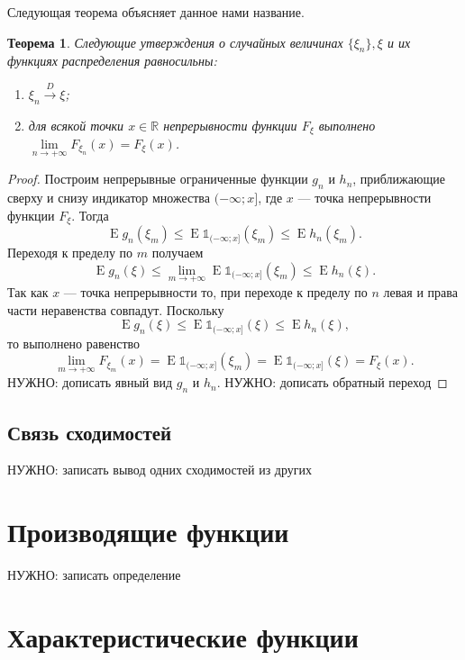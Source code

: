 \documentclass[12pt]{article}
\newtheorem{theorem}{Теорема}
\numberwithin{theorem}{section}
\theoremstyle{definition}
\newcommand{\RR}{\mathbb{R}}
\newcommand{\expect}{\operatorname{E}}
\newcommand{\ind}{\mathds{1}}
\newcommand{\TODO}[1]{\textcolor{todocolor}{НУЖНО: #1}}
\begin{document}
	Следующая теорема объясняет данное нами название.
	
	\begin{theorem}
		Следующие утверждения о случайных величинах $ \{\xi_n\}, \xi $
		и их функциях распределения равносильны:
		\begin{enumerate}
			\item $ \xi_n \overset{D}{\to} \xi $;
			\item для всякой точки $ x \in \RR $ непрерывности функции $ F_{\xi} $ 
			выполнено $ \lim\limits_{n \to +\infty} F_{\xi_n}(x) = F_{\xi}(x) $. 
		\end{enumerate}
	\end{theorem}
	
	\begin{proof}
		Построим непрерывные ограниченные 
		функции $ g_n $ и $ h_n $, приближающие сверху и снизу индикатор множества $ (-\infty; x] $,
		где $ x $ --- точка непрерывности функции $ F_\xi $.
		Тогда 
		$$ \expect g_n(\xi_m) \leqslant \expect \ind_{(-\infty; x]}(\xi_m) \leqslant \expect h_n(\xi_m). $$
		Переходя к пределу по $ m $ получаем
		$$ \expect g_n(\xi) \leqslant 
		 \lim\limits_{m \to +\infty} \expect\ind_{(-\infty; x]}(\xi_m)  \leqslant \expect h_n(\xi). $$
		Так как $ x $ --- точка непрерывности то, при переходе к пределу по $ n $ левая и права части неравенства совпадут.
		Поскольку
		$$ \expect g_n(\xi) \leqslant 
		\expect\ind_{(-\infty; x]}(\xi)  \leqslant \expect h_n(\xi), $$
		то выполнено равенство 
		$$  \lim\limits_{m \to +\infty} F_{\xi_m}(x) 
		= \expect\ind_{(-\infty; x]}(\xi_m) = \expect\ind_{(-\infty; x]}(\xi) = F_\xi(x). $$
		\TODO{дописать явный вид $ g_n $ и $ h_n $}.
		\TODO{дописать обратный переход}
	\end{proof}
	
	\subsection{Связь сходимостей}
	
	\TODO{записать вывод одних сходимостей из других}
	
	\section{Производящие функции}
	
	\TODO{записать определение}
	
	\section{Характеристические функции}
	
\end{document}
